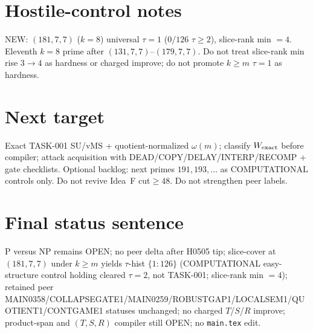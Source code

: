 \documentclass[11pt]{article}
\begin{document}
\section*{Hostile-control notes}
NEW: $(181,7,7)$ ($k{=}8$) universal $\tau{=}1$ ($0/126$ $\tau{\ge}2$), slice-rank min $=4$.
Eleventh $k{=}8$ prime after $(131,7,7)$--$(179,7,7)$.
Do not treat slice-rank min rise $3\to4$ as hardness or charged improve;
do not promote $k{\ge}m$ $\tau{=}1$ as hardness.

\section*{Next target}
Exact TASK-001 SU/vMS + quotient-normalized $\omega(m)$; classify $W_{\rm exact}$ before compiler;
attack acquisition with DEAD/COPY/DELAY/INTERP/RECOMP + gate checklists.
Optional backlog: next primes $191,193,\ldots$ as COMPUTATIONAL controls only.
Do not revive Idea~F cut$\ge48$. Do not strengthen peer labels.

\section*{Final status sentence}
P versus NP remains OPEN; no peer delta after H0505 tip; slice-cover at $(181,7,7)$ under $k{\ge}m$ yields $\tau$-hist $\{1{:}126\}$ (COMPUTATIONAL easy-structure control holding cleared $\tau{=}2$, not TASK-001; slice-rank min $=4$); retained peer MAIN0358/COLLAPSEGATE1/MAIN0259/ROBUSTGAP1/LOCALSEM1/QUOTIENT1/CONTGAME1 statuses unchanged; no charged $T$/$S$/$R$ improve; product-span and $(T,S,R)$ compiler still OPEN; no \texttt{main.tex} edit.
\end{document}
